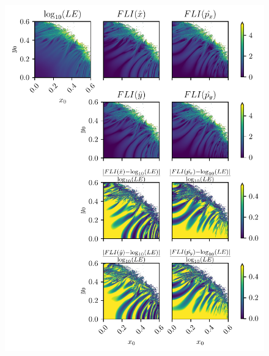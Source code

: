 \begin{figure}[htp]
    \centering
    \includegraphics[width=\columnwidth]{6_dynamic_indicators/figs/LE_FLI_low.pdf}

\end{figure}

